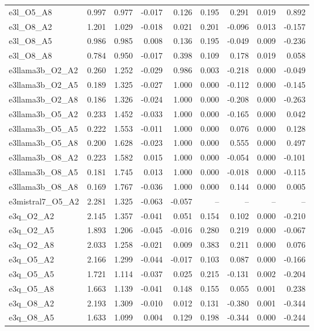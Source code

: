 \documentclass[11pt]{article}
\begin{document}
\begin{landscape}
\begin{longtable}{@{}lrrrrrrrr@{}}
e3l\_O5\_A8 & 0.997 & 0.977 & -0.017 & 0.126 & 0.195 & 0.291 & 0.019 & 0.892 \\
e3l\_O8\_A2 & 1.201 & 1.029 & -0.018 & 0.021 & 0.201 & -0.096 & 0.013 & -0.157 \\
e3l\_O8\_A5 & 0.986 & 0.985 & 0.008 & 0.136 & 0.195 & -0.049 & 0.009 & -0.236 \\
e3l\_O8\_A8 & 0.784 & 0.950 & -0.017 & 0.398 & 0.109 & 0.178 & 0.019 & 0.058 \\
e3llama3b\_O2\_A2 & 0.260 & 1.252 & -0.029 & 0.986 & 0.003 & -0.218 & 0.000 & -0.049 \\
e3llama3b\_O2\_A5 & 0.189 & 1.325 & -0.027 & 1.000 & 0.000 & -0.112 & 0.000 & -0.145 \\
e3llama3b\_O2\_A8 & 0.186 & 1.326 & -0.024 & 1.000 & 0.000 & -0.208 & 0.000 & -0.263 \\
e3llama3b\_O5\_A2 & 0.233 & 1.452 & -0.033 & 1.000 & 0.000 & -0.165 & 0.000 & 0.042 \\
e3llama3b\_O5\_A5 & 0.222 & 1.553 & -0.011 & 1.000 & 0.000 & 0.076 & 0.000 & 0.128 \\
e3llama3b\_O5\_A8 & 0.200 & 1.628 & -0.023 & 1.000 & 0.000 & 0.555 & 0.000 & 0.497 \\
e3llama3b\_O8\_A2 & 0.223 & 1.582 & 0.015 & 1.000 & 0.000 & -0.054 & 0.000 & -0.101 \\
e3llama3b\_O8\_A5 & 0.181 & 1.745 & 0.013 & 1.000 & 0.000 & -0.018 & 0.000 & -0.115 \\
e3llama3b\_O8\_A8 & 0.169 & 1.767 & -0.036 & 1.000 & 0.000 & 0.144 & 0.000 & 0.005 \\
e3mistral7\_O5\_A2 & 2.281 & 1.325 & -0.063 & -0.057 & -- & -- & -- & -- \\
e3q\_O2\_A2 & 2.145 & 1.357 & -0.041 & 0.051 & 0.154 & 0.102 & 0.000 & -0.210 \\
e3q\_O2\_A5 & 1.893 & 1.206 & -0.045 & -0.016 & 0.280 & 0.219 & 0.000 & -0.067 \\
e3q\_O2\_A8 & 2.033 & 1.258 & -0.021 & 0.009 & 0.383 & 0.211 & 0.000 & 0.076 \\
e3q\_O5\_A2 & 2.166 & 1.299 & -0.044 & -0.017 & 0.103 & 0.087 & 0.000 & -0.166 \\
e3q\_O5\_A5 & 1.721 & 1.114 & -0.037 & 0.025 & 0.215 & -0.131 & 0.002 & -0.204 \\
e3q\_O5\_A8 & 1.663 & 1.139 & -0.041 & 0.148 & 0.155 & 0.055 & 0.001 & 0.238 \\
e3q\_O8\_A2 & 2.193 & 1.309 & -0.010 & 0.012 & 0.131 & -0.380 & 0.001 & -0.344 \\
e3q\_O8\_A5 & 1.633 & 1.099 & 0.004 & 0.129 & 0.198 & -0.344 & 0.000 & -0.244 \\

\end{longtable}
\end{landscape}
\end{document}
